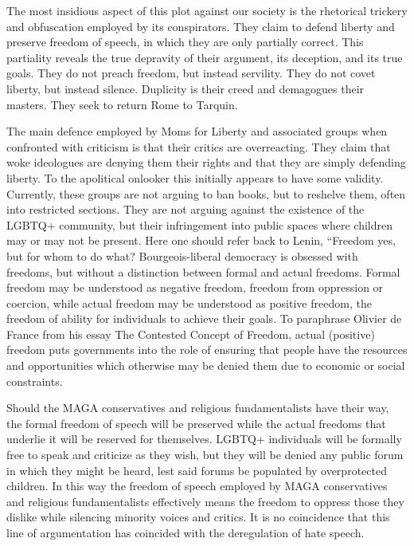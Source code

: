 \documentclass[
]{book}
\begin{document}
The most insidious aspect of this plot against our society is the rhetorical trickery and obfuscation employed by its conspirators. They claim to defend liberty and preserve freedom of speech, in which they are only partially correct. This partiality reveals the true depravity of their argument, its deception, and its true goals. They do not preach freedom, but instead servility. They do not covet liberty, but instead silence. Duplicity is their creed and demagogues their masters. They seek to return Rome to Tarquin.

The main defence employed by Moms for Liberty and associated groups when confronted with criticism is that their critics are overreacting. They claim that woke ideologues are denying them their rights and that they are simply defending liberty. To the apolitical onlooker this initially appears to have some validity. Currently, these groups are not arguing to ban books, but to reshelve them, often into restricted sections. They are not arguing against the existence of the LGBTQ+ community, but their infringement into public spaces where children may or may not be present. Here one should refer back to Lenin, ``Freedom yes, but for whom to do what? Bourgeois-liberal democracy is obsessed with freedoms, but without a distinction between formal and actual freedoms. Formal freedom may be understood as negative freedom, freedom from oppression or coercion, while actual freedom may be understood as positive freedom, the freedom of ability for individuals to achieve their goals. To paraphrase Olivier de France from his essay The Contested Concept of Freedom, actual (positive) freedom puts governments into the role of ensuring that people have the resources and opportunities which otherwise may be denied them due to economic or social constraints.

Should the MAGA conservatives and religious fundamentalists have their way, the formal freedom of speech will be preserved while the actual freedoms that underlie it will be reserved for themselves. LGBTQ+ individuals will be formally free to speak and criticize as they wish, but they will be denied any public forum in which they might be heard, lest said forums be populated by overprotected children. In this way the freedom of speech employed by MAGA conservatives and religious fundamentalists effectively means the freedom to oppress those they dislike while silencing minority voices and critics. It is no coincidence that this line of argumentation has coincided with the deregulation of hate speech.
\end{document}
